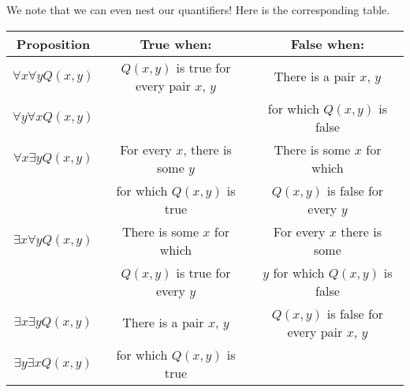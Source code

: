 \documentclass[../notes.tex]{subfiles}
\begin{document}
We note that we can even nest our quantifiers! Here is the corresponding table.
\begin{center}
    \begin{tabular}{c|c|c}
    Proposition & True when: & False when: \\
    \hline
    $\forall x \forall y Q(x,y)$ & $Q(x, y)$ is true for every pair $x$, $y$ & There is a pair $x$, $y$  \\
    $\forall y \forall x Q(x,y)$ & & for which $Q(x, y)$ is false \\
    \hline
     $\forall x \exists y Q(x,y)$ & For every $x$, there is some $y$ & There is some $x$ for which \\
     & for which $Q(x, y)$ is true & $Q(x,y)$ is false for every $y$\\
     \hline
     $\exists x \forall y Q(x,y)$ & There is some $x$ for which & For every $x$ there is some \\
     & $Q(x,y)$ is true for every $y$ & $y$ for which $Q(x,y)$ is false\\
     \hline
     $\exists x \exists y Q(x,y)$ & There is a pair $x$, $y$ & $Q(x, y)$ is false for every pair $x$, $y$  \\
    $\exists y \exists x Q(x,y)$ &  for which $Q(x, y)$ is true & \\
    \end{tabular}
\end{center}
\end{document}
